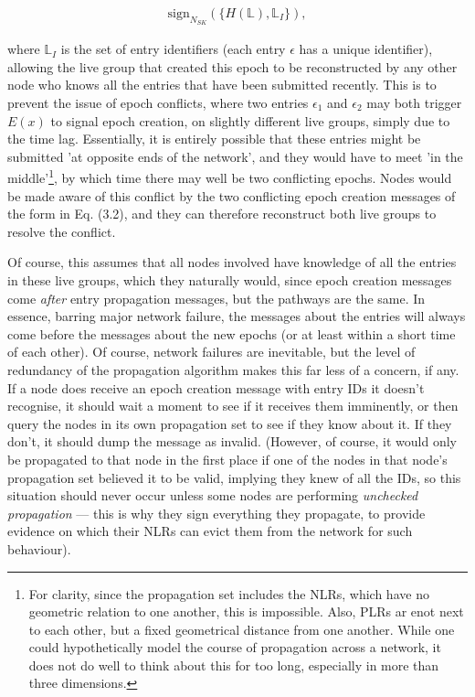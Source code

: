 \documentclass{extreport}
\begin{document}
\begin{align*}
\mathrm{sign}_{N_{SK}}(\{ H(\mathbb{L}), \mathbb{L}_I \}), \tag{3.2}
\end{align*}

where \(\mathbb{L}_I\) is the set of entry identifiers (each entry \(\epsilon\) has a unique identifier), allowing the live group that created this epoch to be reconstructed by any other node who knows all the entries that have been submitted recently. This is to prevent the issue of epoch conflicts, where two entries \(\epsilon_1\) and \(\epsilon_2\) may both trigger \(E(x)\) to signal epoch creation, on slightly different live groups, simply due to the time lag. Essentially, it is entirely possible that these entries might be submitted 'at opposite ends of the network', and they would have to meet 'in the middle'\footnote{For clarity, since the propagation set includes the NLRs, which have no geometric relation to one another, this is impossible. Also, PLRs ar enot next to each other, but a fixed geometrical distance from one another. While one could hypothetically model the course of propagation across a network, it does not do well to think about this for too long, especially in more than three dimensions.}, by which time there may well be two conflicting epochs. Nodes would be made aware of this conflict by the two conflicting epoch creation messages of the form in Eq. (3.2), and they can therefore reconstruct both live groups to resolve the conflict.

Of course, this assumes that all nodes involved have knowledge of all the entries in these live groups, which they naturally would, since epoch creation messages come \emph{after} entry propagation messages, but the pathways are the same. In essence, barring major network failure, the messages about the entries will always come before the messages about the new epochs (or at least within a short time of each other). Of course, network failures are inevitable, but the level of redundancy of the propagation algorithm makes this far less of a concern, if any. If a node does receive an epoch creation message with entry IDs it doesn't recognise, it should wait a moment to see if it receives them imminently, or then query the nodes in its own propagation set to see if they know about it. If they don't, it should dump the message as invalid. (However, of course, it would only be propagated to that node in the first place if one of the nodes in that node's propagation set believed it to be valid, implying they knew of all the IDs, so this situation should never occur unless some nodes are performing \emph{unchecked propagation} --- this is why they sign everything they propagate, to provide evidence on which their NLRs can evict them from the network for such behaviour).
\end{document}
